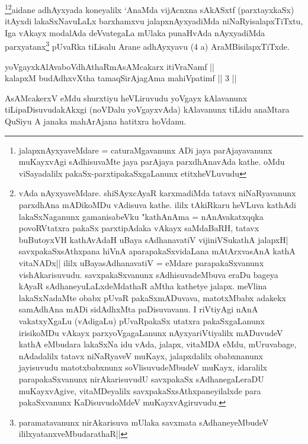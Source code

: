 \begin{artha}
\footnote{jalapxnAyxyaveMdare = caturaMgavanunx ADi jaya parAjayavanunx muKayxvAgi sAdhisuvaMte jaya parAjaya parxdhAnavAda kathe. oMdu viSayadalilx pakaSx-parxtipakaSxgaLanunx etitxheVLuvudu}\footnote{vAda nAyxyaveMdare. shiSAyxcAyaR karxmadiMda tatavx niNaRyavanunx parxdhAna mADikoMDu vAdisuva kathe. ililx tAkiRkaru heVLuva kathAdi lakaSxNaganunx gamanisabeVku "kathAnAma = nAnAvakatxqqka povoRVtatxra pakaSx parxtipAdaka vAkayx saMdaBaRH, tatavx buButoyxVH kathAvAdaH uBaya sAdhanavatiV vijiniVSukathA jalapxH| savxpakaSxsAthxpana hiVnA aparapakaSxvidaLana mAtArxvasAnA kathA vitaNADx|| ililx uBayasAdhanavatiV = eMdare parapakaSxvanunx vishAkarisuvudu. savxpakaSxvanunx sAdhisuvadeMbuva eraDu bageya kAyaR sAdhaneyuLaLxdeMdathaR aMtha kathetye jalapx. meVlina lakaSxNadaMte obabx pUvaR pakaSxmADuvava, matotxMbabx adakekx samAdhAna mADi sidAdhxMta paDisuvavanu. I riVtiyAgi nAnA vakatxyXgaLu (vAdigaLu) pUvaRpakaSx utatxra pakaSxgaLanunx irisikoMDu vAkayx parxyoVgagaLanunx nAyxyariVtiyalilx mADuvudeV kathA eMbudara lakaSxNa idu vAda, jalapx, vitaMDA eMdu, mUruvabage, nAdadalilx tatavx niNaRyaveV muKayx, jalapxdalilx obabxnanunx jayisuvudu matotxbabxnunx soVlisuvudeMbudeV muKayx, idaralilx parapakaSxvanunx nirAkarisuvudU savxpakaSx sAdhanegaLeraDU muKayxvAgive, vitaMDeyalilx savxpakaSxsAthxpaneyilalxde para pakaSxvanunx KaDisuvudoMdeV muKayxvAgiruvudu.}aidane adhAyxyada koneyalilx `AnaMda vijAcnxna sAkASxtf (parxtayxkaSx) itAyxdi lakaSxNavuLaLx barxhamxvu jalapxnAyxyadiMda niNaRyisalapxTiTxtu, Iga vAkayx modalAda deVvategaLa mUlaka punaHvAda nAyxyadiMda parxyatanx\footnote{paramatavanunx nirAkarisuva mUlaka savxmata sAdhaneyeMbudeV ililxyatanxveMbudarathaR||} pUvaRka tiLisalu Arane adhAyxyavu (4 a) AraMBisilapxTiTxde.
\end{artha}

\begin{shl}
yoVgayxkAlAvaboVdhAthaRmAsAMcakarx itiVraNamf || \\
kalapxM budAdhxvX\s tha tamaqSirAjagAma mahiVpatimf \hfill ||  3 ||  
\end{shl}

\begin{artha}
AsAMcakerxV eMdu shurxtiyu heVLiruvudu yoVgayx kAlavanunx tiLipaDisuvudakAkxgi (noVDalu yoVgayxvAda) kAlavanunx tiLidu anaMtara QuSiyu A janaka mahArAjana hatitxra hoVdanu.
\end{artha}


